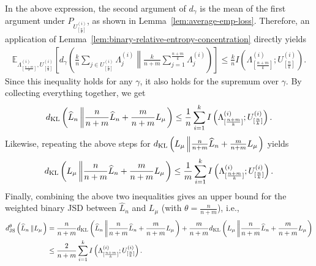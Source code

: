 \documentclass[onecolumn,romanappendices,10pt]{IEEEtran}
\newcommand{\EE}{{\mathbb{E}}}
\begin{document}
	In the above expression, the second argument of $d_\gamma$ is the mean of the first argument under $P_{U^{(i)}_{[\frac{n}{k}]}}$, as shown in Lemma~\ref{lem:average-emp-loss}. Therefore, an application of Lemma~\ref{lem:binary-relative-entropy-concentration} directly yields
	\begin{equation}
		\begin{aligned}
			\EE_{\Lambda^{(i)}_{[\frac{n+m}{k}]}, U^{(i)}_{[\frac{n}{k}]}} \left[ d_{\gamma} \left( \frac{k}{n} \sum_{j \in U^{(i)}_{[\frac{n}{k}]}} \Lambda^{(i)}_j \left\| \frac{k}{n+m} \sum_{j=1}^{\frac{n+m}{k}} \Lambda^{(i)}_j \right. \right) \right] \leq \frac{k}{n} I\left( \Lambda^{(i)}_{[\frac{n+m}{k}]} ;  U^{(i)}_{[\frac{n}{k}]} \right).
		\end{aligned}
	\end{equation}
	Since this inequality holds for any $\gamma$, it also holds for the supremum over $\gamma$. By collecting everything together, we get
	\begin{equation}
		\begin{aligned}
			d_{\textnormal{KL}} \left(\widehat{L}_n \left\| \frac{n}{n+m} \widehat{L}_n + \frac{m}{n+m} L_\mu \right.\right) \leq \frac{1}{n} \sum_{i=1}^k I\left( \Lambda^{(i)}_{[\frac{n+m}{k}]} ;  U^{(i)}_{[\frac{n}{k}]} \right).
		\end{aligned}\label{eq:d_KL_emp}
	\end{equation}
	Likewise, repeating the above steps for $d_{\textnormal{KL}} \left(L_\mu \left\| \frac{n}{n+m} \widehat{L}_n + \frac{m}{n+m} L_\mu \right.\right)$ yields
	\begin{equation}
		\begin{aligned}
			d_{\textnormal{KL}} \left(L_\mu \left\| \frac{n}{n+m} \widehat{L}_n + \frac{m}{n+m} L_\mu \right.\right) \leq \frac{1}{m} \sum_{i=1}^k I\left( \Lambda^{(i)}_{[\frac{n+m}{k}]} ;  U^{(i)}_{[\frac{n}{k}]} \right).
		\end{aligned}\label{eq:d_KL_pop}
	\end{equation}
	Finally, combining the above two inequalities gives an upper bound for the weighted binary JSD between $\widehat{L}_n$ and $L_\mu$ (with $\theta = \frac{n}{n+m}$), i.e., 
	\begin{equation}
		\begin{aligned}
			d^\theta_{\textnormal{JS}} \left(\widehat{L}_n \left\| L_\mu \right.\right) &= \frac{n}{n+m} d_{\textnormal{KL}} \left(\widehat{L}_n \left\| \frac{n}{n+m} \widehat{L}_n + \frac{m}{n+m} L_\mu \right.\right) + \frac{m}{n+m} d_{\textnormal{KL}} \left(L_\mu \left\| \frac{n}{n+m} \widehat{L}_n + \frac{m}{n+m} L_\mu \right.\right) \\
			&\leq \frac{2}{n+m} \sum_{i=1}^k I\left( \Lambda^{(i)}_{[\frac{n+m}{k}]} ;  U^{(i)}_{[\frac{n}{k}]} \right).
		\end{aligned}\label{eq:d_JS_IPCIMI}
	\end{equation}
	
\end{document}

